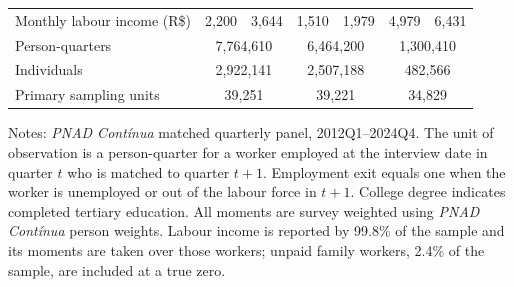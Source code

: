 \begin{table}[H]
\begin{threeparttable}
\begin{tabular}{lcccccc}
Monthly labour income (R\$) & 2,200 & 3,644 & 1,510 & 1,979 & 4,979 & 6,431 \\
\addlinespace
Person-quarters & \multicolumn{2}{c}{7,764,610} & \multicolumn{2}{c}{6,464,200} & \multicolumn{2}{c}{1,300,410} \\
Individuals & \multicolumn{2}{c}{2,922,141} & \multicolumn{2}{c}{2,507,188} & \multicolumn{2}{c}{482,566} \\
Primary sampling units & \multicolumn{2}{c}{39,251} & \multicolumn{2}{c}{39,221} & \multicolumn{2}{c}{34,829} \\
\bottomrule
\end{tabular}
\begin{tablenotes}[flushleft]\footnotesize
\item Notes: \textit{PNAD Cont\'inua} matched quarterly panel, 2012Q1--2024Q4. The unit of observation is a person-quarter for a worker employed at the interview date in quarter $t$ who is matched to quarter $t+1$. Employment exit equals one when the worker is unemployed or out of the labour force in $t+1$. College degree indicates completed tertiary education. All moments are survey weighted using \textit{PNAD Cont\'inua} person weights. Labour income is reported by 99.8\% of the sample and its moments are taken over those workers; unpaid family workers, 2.4\% of the sample, are included at a true zero.
\end{tablenotes}
\end{threeparttable}
\end{table}
